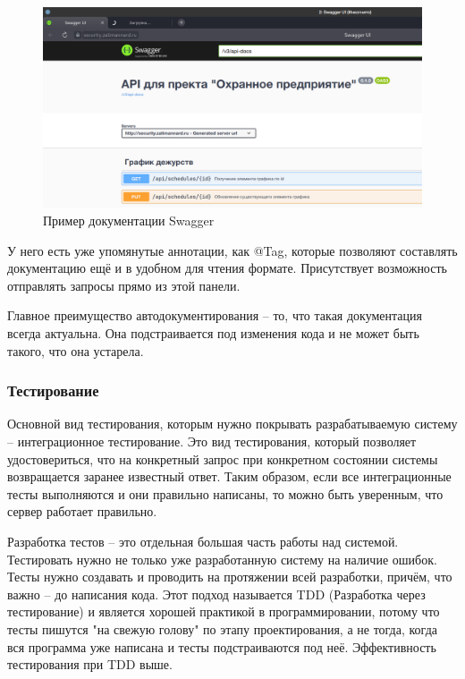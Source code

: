 \documentclass[a4paper,article]{article}
\begin{document}
    \begin{figure}[h]
        
        \centering
        
        \includegraphics[width=0.8\linewidth]{Swagger.png}
        
        \caption{\centering Пример документации Swagger}
        
        \label{fig:Swagger}
        
    \end{figure}
    
    У него есть уже упомянутые аннотации, как @Tag, которые позволяют составлять документацию ещё и в удобном для чтения формате. Присутствует возможность отправлять запросы прямо из этой панели.
    
    Главное преимущество автодокументирования -- то, что такая документация всегда актуальна. Она подстраивается под изменения кода и не может быть такого, что она устарела.

    \subsubsection{Тестирование}\label{Реализация. Сервер. Тестирование}
    
    Основной вид тестирования, которым нужно покрывать разрабатываемую систему -- интеграционное тестирование. Это вид тестирования, который позволяет удостовериться, что на конкретный запрос при конкретном состоянии системы возвращается заранее известный ответ. Таким образом, если все интеграционные тесты выполняются и они правильно написаны, то можно быть уверенным, что сервер работает правильно.
    
    Разработка тестов -- это отдельная большая часть работы над системой. Тестировать нужно не только уже разработанную систему на наличие ошибок. Тесты нужно создавать и проводить на протяжении всей разработки, причём, что важно -- до написания кода. Этот подход называется TDD (Разработка через тестирование) и является хорошей практикой в программировании, потому что тесты пишутся "на свежую голову" по этапу проектирования, а не тогда, когда вся программа уже написана и тесты подстраиваются под неё. Эффективность тестирования при TDD выше.~\cite{cleancode}
    
\end{document}
